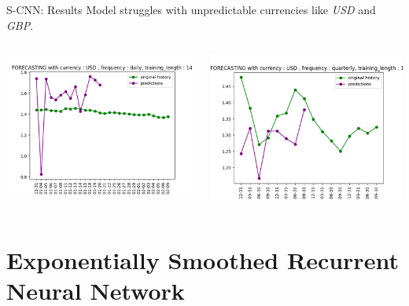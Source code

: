 \documentclass[aspectratio=169, 12pt]{beamer}
\begin{document}
\begin{frame}[allowframebreaks]{S-CNN: Results}
Model struggles with unpredictable currencies like \textit{USD} and \textit{GBP}.
\begin{columns}
    \begin{column}{0.5\textwidth}
        \includegraphics[width=\linewidth]{plots/usd-d.png}
    \end{column}
    \begin{column}{0.5\textwidth}
        \includegraphics[width=\linewidth]{plots/usd-r.png}
    \end{column}
\end{columns}

\end{frame}

\section{Exponentially Smoothed Recurrent Neural Network}
\end{document}
